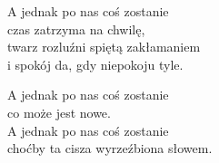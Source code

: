 
\begin{text}
    A jednak po nas coś zostanie\\
    czas zatrzyma na chwilę,\\
    twarz rozluźni spiętą zakłamaniem\\
    i spokój da, gdy niepokoju tyle.

    A jednak po nas coś zostanie\\
    co może jest nowe.\\
    A jednak po nas coś zostanie\\
    choćby ta cisza wyrzeźbiona słowem.
\end{text}
\begin{chord}

\end{chord}